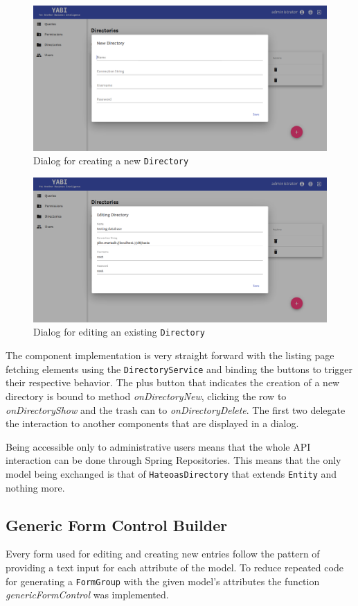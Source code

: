 \begin{figure}
  \centering
  \includegraphics[width=.8\textwidth]{images/screenshots/directory/directory-new}
  \caption{Dialog for creating a new \texttt{Directory}}\label{fig:dirnew}
\end{figure}

\begin{figure}
  \centering
  \includegraphics[width=.8\textwidth]{images/screenshots/directory/directory-edit}
  \caption{Dialog for editing an existing \texttt{Directory}}\label{fig:diredit}
\end{figure}

The component implementation is very straight forward with the listing page fetching elements using the \texttt{DirectoryService} and binding the buttons to trigger their respective behavior. The plus button that indicates the creation of a new directory is bound to method \textit{onDirectoryNew}, clicking the row to \textit{onDirectoryShow} and the trash can to \textit{onDirectoryDelete}. The first two delegate the interaction to another components that are displayed in a dialog. 

Being accessible only to administrative users means that the whole \gls{API} interaction can be done through Spring Repositories. This means that the only model being exchanged is that of \texttt{HateoasDirectory} that extends \texttt{Entity} and nothing more.

\subsection{Generic Form Control Builder}
Every form used for editing and creating new entries follow the pattern of providing a text input for each attribute of the model. To reduce repeated code for generating a \texttt{FormGroup} with the given model's attributes the function \textit{genericFormControl} was implemented.

